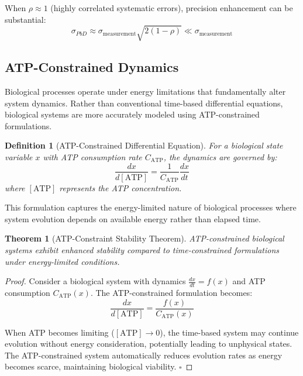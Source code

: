 \documentclass[12pt,a4paper]{article}
\newtheorem{theorem}{Theorem}
\newtheorem{definition}{Definition}
\begin{document}
When $\rho \approx 1$ (highly correlated systematic errors), precision enhancement can be substantial:
\begin{equation}
\sigma_{PbD} \approx \sigma_{\text{measurement}}\sqrt{2(1-\rho)} \ll \sigma_{\text{measurement}}
\end{equation}

\subsection{ATP-Constrained Dynamics}

Biological processes operate under energy limitations that fundamentally alter system dynamics. Rather than conventional time-based differential equations, biological systems are more accurately modeled using ATP-constrained formulations.

\begin{definition}[ATP-Constrained Differential Equation]
For a biological state variable $x$ with ATP consumption rate $C_{\text{ATP}}$, the dynamics are governed by:
\begin{equation}
\frac{dx}{d[\text{ATP}]} = \frac{1}{C_{\text{ATP}}}\frac{dx}{dt}
\end{equation}
where $[\text{ATP}]$ represents the ATP concentration.
\end{definition}

This formulation captures the energy-limited nature of biological processes where system evolution depends on available energy rather than elapsed time.

\begin{theorem}[ATP-Constraint Stability Theorem]
ATP-constrained biological systems exhibit enhanced stability compared to time-constrained formulations under energy-limited conditions.
\end{theorem}

\begin{proof}
Consider a biological system with dynamics $\frac{dx}{dt} = f(x)$ and ATP consumption $C_{\text{ATP}}(x)$. The ATP-constrained formulation becomes:
\begin{equation}
\frac{dx}{d[\text{ATP}]} = \frac{f(x)}{C_{\text{ATP}}(x)}
\end{equation}

When ATP becomes limiting ($[\text{ATP}] \to 0$), the time-based system may continue evolution without energy consideration, potentially leading to unphysical states. The ATP-constrained system automatically reduces evolution rates as energy becomes scarce, maintaining biological viability. $\square$
\end{proof}
\end{document}
